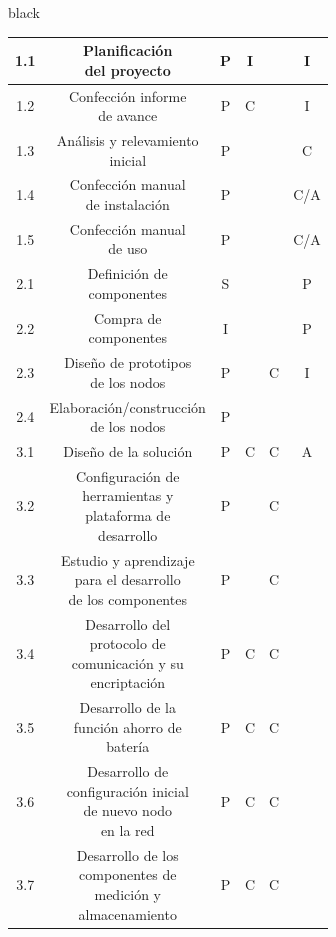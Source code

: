 \documentclass[11pt]{charter}
\begin{document}
\begin{consigna}{black}
\begin{table}[htpb]
{\begin{tabular}{|c|c|c|c|c|c|}
1.1 & \makecell{Planificación \\ del proyecto}  & P  & I &  & I \\ \hline
1.2 & \makecell{Confección informe \\ de avance} & P & C &  & I \\ \hline
1.3 & \makecell{Análisis y relevamiento \\ inicial} & P &  &  & C \\ \hline
1.4 & \makecell{Confección manual \\ de instalación} & P &  &  & C/A \\ \hline
1.5 & \makecell{Confección manual \\ de uso} & P &  &  & C/A \\ \hline
2.1 & \makecell{Definición de \\ componentes} & S &  &  & P\\ \hline
2.2 & \makecell{Compra de \\componentes} & I &  &  & P \\ \hline
2.3 & \makecell{Diseño de prototipos \\ de los nodos} & P &  & C & I\\ \hline 
2.4 & \makecell{Elaboración/construcción \\ de los nodos} & P &  &  & \\ \hline
3.1 & Diseño de la solución & P & C & C & A\\ \hline
3.2 & \makecell{Configuración de  \\ herramientas y  \\ plataforma de\\ desarrollo}  & P &  & C & \\ \hline

3.3 & \makecell{Estudio y aprendizaje \\ para el desarrollo  \\ de los componentes} & P &  & C & \\ \hline
3.4 & \makecell{Desarrollo del \\ protocolo de \\ comunicación y su\\ encriptación} & P & C & C & \\ \hline
3.5 & \makecell{Desarrollo de la \\ función ahorro de \\ batería} & P & C  & C & \\ \hline
3.6 & \makecell{Desarrollo de \\configuración inicial\\ de nuevo nodo \\ en la red} & P & C & C & \\ \hline
3.7 & \makecell{Desarrollo de los \\ componentes de \\  medición y \\ almacenamiento} & P & C & C & \\ \hline


\end{tabular}}
\end{table}
\end{consigna}
\end{document}
